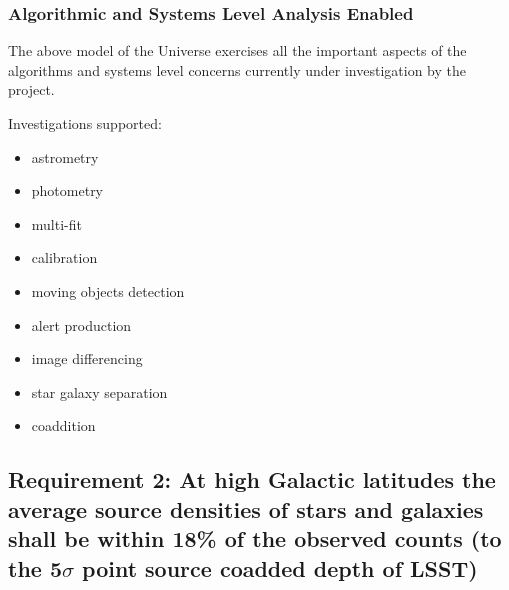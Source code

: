 \documentclass[]{article}
\begin{document}
\subsubsection{Algorithmic and Systems Level Analysis Enabled}
The above model of the Universe exercises all the important aspects of the algorithms and systems level concerns currently under investigation
by the project.

Investigations supported:
\begin{itemize}
\item astrometry
\item photometry
\item multi-fit
\item calibration
\item moving objects detection
\item alert production
\item image differencing
\item star galaxy separation
\item coaddition
\end{itemize}

\subsection{Requirement 2: At high Galactic latitudes the average source densities of stars and galaxies
shall be within 18\% of the observed counts (to the 5$\sigma$ point source coadded depth of LSST)}
\end{document}
